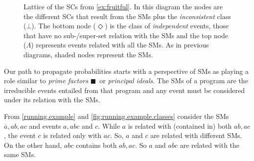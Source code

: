 \documentclass{tlp}
\newcommand{\co}[1]{\ensuremath{\overline{#1}}}     %
\newcommand{\inconsistent}{\bot}
\newcommand{\bottomclass}{\ensuremath{\Lambda}}
\newcommand{\indepclass}{\ensuremath{\Diamond}}
\newcommand{\LOOK}{\ensuremath{\blacksquare}}
\newcommand{\franc}[1]{{\color{green!30!black}#1}}
\begin{document}
%
%
\begin{figure}[t]
  \begin{center}
  \end{center}

  \caption{%
    Lattice of the \aclp{SC} from \cref{ex:fruitful}.  In this diagram
    the nodes are the different \aclp{SC} that result from the
    \aclp{SM} plus the \emph{inconsistent} class (\(\inconsistent\)).
    The bottom node (\(\indepclass\)) is the class of
    \emph{independent} events, those that have no sub-/super-set
    relation with the \acp{SM} and the top node (\(\bottomclass\))
    represents events related with all the \acp{SM}.  As in previous
    diagrams, shaded nodes represent the \acp{SM}.}
  \label{fig:fruitful.lattice}
\end{figure}

Our path to propagate probabilities starts with a perspective of
\aclp{SM} as playing a role similar to \emph{prime factors}
\franc{\LOOK~or \emph{principal ideals}}.  The \aclp{SM} of a program
are the irreducible events entailed from that program and any event
must be considered under its relation with the \aclp{SM}.

From \cref{running.example} and \cref{fig:running.example.classes}
consider the \aclp{SM} \(\co{a}, ab, ac\) and events \(a, abc\) and
\(c\).  While \(a\) is related with (contained in) both \(ab, ac\),
the event \(c\) is related only with \(ac\).  So, \(a\) and \(c\) are
related with different \aclp{SM}.  On the other hand, \(abc\) contains
both \(ab, ac\).  So \(a\) and \(abc\) are related with the same
\aclp{SM}.
\end{document}
